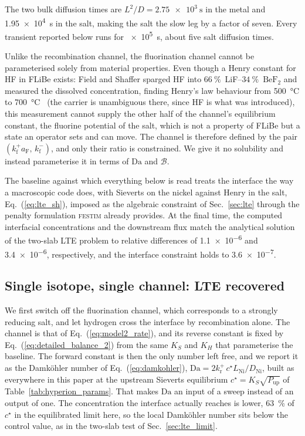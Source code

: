 \documentclass[5p]{elsarticle}
\newcommand{\FESTIM}{\textsc{festim}}
\newcommand{\Da}{\mathrm{Da}}
\newcommand{\Bra}{\mathcal{B}}             %
\begin{document}
The two bulk diffusion times are $L^{2}/D = \qty{2.75e3}{\second}$ in the metal and \qty{1.95e4}{\second} in the salt, making the salt the slow leg by a factor of seven.
Every transient reported below runs for \qty{e5}{\second}, about five salt diffusion times.

Unlike the recombination channel, the fluorination channel cannot be parameterised solely from material properties.
Even though a Henry constant for HF in FLiBe exists: Field and Shaffer sparged HF into $\qty{66}{\percent}$~LiF--$\qty{34}{\percent}$~$\mathrm{BeF_2}$ and measured the dissolved concentration, finding Henry's law behaviour from \qty{500}{\degreeCelsius} to \qty{700}{\degreeCelsius}~\cite{field_solubilities_1967} (the carrier is unambiguous there, since HF is what was introduced), this measurement cannot supply the other half of the channel's equilibrium constant, the fluorine potential of the salt, which is not a property of FLiBe but a state an operator sets and can move.
The channel is therefore defined by the pair $(k_\mathrm{f}^{+}a_\mathrm{F},\, k_\mathrm{f}^{-})$, and only their ratio is constrained.
We give it no solubility and instead parameterise it in terms of $\Da$ and $\Bra$.

The baseline against which everything below is read treats the interface the way a macroscopic code does, with Sieverts on the nickel against Henry in the salt, Eq.~(\ref{eq:lte_sh}), imposed as the algebraic constraint of Sec.~\ref{sec:lte} through the penalty formulation \FESTIM{} already provides.
At the final time, the computed interfacial concentrations and the downstream flux match the analytical solution of the two-slab LTE problem to relative differences of \num{1.1e-6} and \num{3.4e-6}, respectively, and the interface constraint holds to \num{3.6e-7}.

\subsection{Single isotope, single channel: LTE recovered}
\label{sec:hyperion_lte}

We first switch off the fluorination channel, which corresponds to a strongly reducing salt, and let hydrogen cross the interface by recombination alone.
The channel is that of Eq.~(\ref{eq:model2_rate}), and its reverse constant is fixed by Eq.~(\ref{eq:detailed_balance_2}) from the same $K_S$ and $K_H$ that parameterise the baseline.
The forward constant is then the only number left free, and we report it as the Damk\"ohler number of Eq.~(\ref{eq:damkohler}), $\Da = 2k_\mathrm{r}^{+}\,c^{\star}L_\mathrm{Ni}/D_\mathrm{Ni}$, built as everywhere in this paper at the upstream Sieverts equilibrium $c^{\star} = K_S\sqrt{P_\mathrm{up}}$ of Table~\ref{tab:hyperion_params}.
That makes $\Da$ an input of a sweep instead of an output of one.
The concentration the interface actually reaches is lower, \qty{63}{\percent} of $c^{\star}$ in the equilibrated limit here, so the local Damk\"ohler number sits below the control value, as in the two-slab test of Sec.~\ref{sec:lte_limit}.
\end{document}
